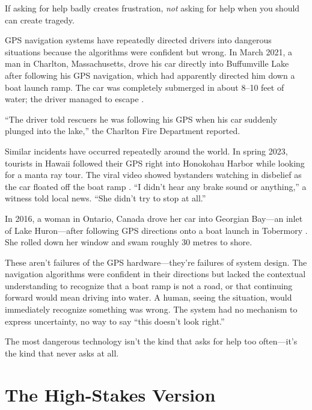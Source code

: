 If asking for help badly creates frustration, \emph{not} asking for help when you should can create tragedy.

GPS navigation systems have repeatedly directed drivers into dangerous situations because the algorithms were confident but wrong. In March 2021, a man in Charlton, Massachusetts, drove his car directly into Buffumville Lake after following his GPS navigation, which had apparently directed him down a boat launch ramp. The car was completely submerged in about 8--10 feet of water; the driver managed to escape \autocite{globe2021charlton}.

``The driver told rescuers he was following his GPS when his car suddenly plunged into the lake,'' the Charlton Fire Department reported.

Similar incidents have occurred repeatedly around the world. In spring 2023, tourists in Hawaii followed their GPS right into Honokohau Harbor while looking for a manta ray tour. The viral video showed bystanders watching in disbelief as the car floated off the boat ramp \autocite{hnn2023honokohau}. ``I didn't hear any brake sound or anything,'' a witness told local news. ``She didn't try to stop at all.''

In 2016, a woman in Ontario, Canada drove her car into Georgian Bay---an inlet of Lake Huron---after following GPS directions onto a boat launch in Tobermory \autocite{cbc2016gps}. She rolled down her window and swam roughly 30 metres to shore.

These aren't failures of the GPS hardware---they're failures of system design. The navigation algorithms were confident in their directions but lacked the contextual understanding to recognize that a boat ramp is not a road, or that continuing forward would mean driving into water. A human, seeing the situation, would immediately recognize something was wrong. The system had no mechanism to express uncertainty, no way to say ``this doesn't look right.''

\begin{keyconcept}
The most dangerous technology isn't the kind that asks for help too often---it's the kind that never asks at all.
\end{keyconcept}

\section{The High-Stakes Version}

